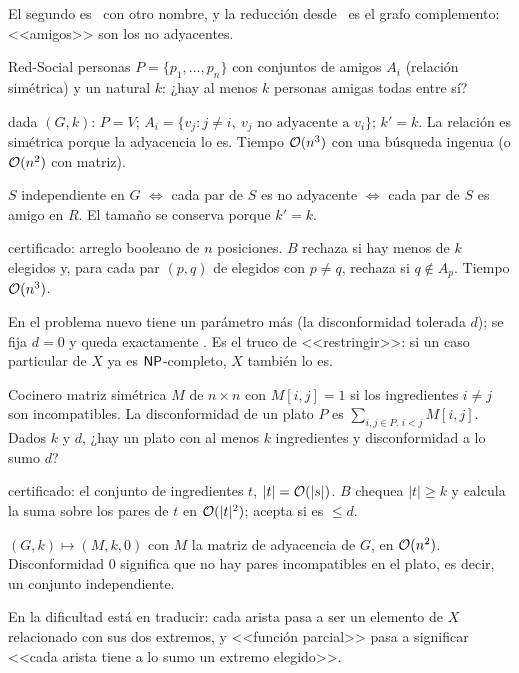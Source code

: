 El segundo es \npCL\ con otro nombre, y la reducción desde \npIS\ es el grafo complemento: <<amigos>> son los no adyacentes.

\begin{problema}{Red-Social}
 personas $P=\{p_1,\dots,p_n\}$ con conjuntos de amigos $A_i$ (relación simétrica) y un natural $k$: ¿hay al menos $k$ personas amigas todas entre sí?

 dada $(G,k)$: $P=V$; $A_i=\{v_j : j\ne i,\ v_j \text{ no adyacente a } v_i\}$; $k'=k$. La relación es simétrica porque la adyacencia lo es. Tiempo $\mathcal{O}(n^3)$ con una búsqueda ingenua (o $\mathcal{O}(n^2)$ con matriz).

 $S$ independiente en $G$ $\iff$ cada par de $S$ es no adyacente $\iff$ cada par de $S$ es amigo en $R$. El tamaño se conserva porque $k'=k$.

 certificado: arreglo booleano de $n$ posiciones. $B$ rechaza si hay menos de $k$ elegidos y, para cada par $(p,q)$ de elegidos con $p\ne q$, rechaza si $q\notin A_p$. Tiempo $\mathcal{O}(n^3)$.
\end{problema}

En  el problema nuevo tiene un parámetro más (la disconformidad tolerada $d$); se fija $d=0$ y queda exactamente \npIS. Es el truco de <<restringir>>: si un caso particular de $X$ ya es $\mathsf{NP}$-completo, $X$ también lo es.

\begin{problema}{Cocinero}
 matriz simétrica $M$ de $n\times n$ con $M[i,j]=1$ si los ingredientes $i\ne j$ son incompatibles. La disconformidad de un plato $P$ es $\sum_{i,j\in P,\,i<j}M[i,j]$. Dados $k$ y $d$, ¿hay un plato con al menos $k$ ingredientes y disconformidad a lo sumo $d$?

 certificado: el conjunto de ingredientes $t$, $|t|=\mathcal{O}(|s|)$. $B$ chequea $|t|\ge k$ y calcula la suma sobre los pares de $t$ en $\mathcal{O}(|t|^2)$; acepta si es $\le d$.

 $(G,k)\mapsto(M,k,0)$ con $M$ la matriz de adyacencia de $G$, en $\mathcal{O}(n^2)$. Disconformidad 0 significa que no hay pares incompatibles en el plato, es decir, un conjunto independiente.
\end{problema}

En  la dificultad está en traducir: cada arista pasa a ser un elemento de $X$ relacionado con sus dos extremos, y <<función parcial>> pasa a significar <<cada arista tiene a lo sumo un extremo elegido>>.

